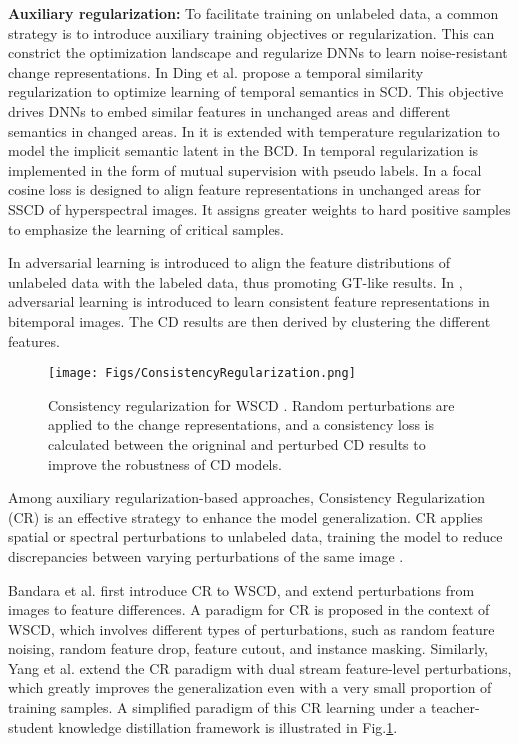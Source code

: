 \textbf{Auxiliary regularization:}
To facilitate training on unlabeled data, a common strategy is to introduce auxiliary training objectives or regularization. This can constrict the optimization landscape and regularize DNNs to learn noise-resistant change representations. In \cite{ding2022bi} Ding et al. propose a temporal similarity regularization to optimize learning of temporal semantics in SCD. This objective drives DNNs to embed similar features in unchanged areas and different semantics in changed areas. In \cite{ding2024samcd} it is extended with temperature regularization to model the implicit semantic latent in the BCD. In \cite{zheng2024detail} temporal regularization is implemented in the form of mutual supervision with pseudo labels.  In \cite{hu2022hypernet} a focal cosine loss is designed to align feature representations in unchanged areas for SSCD of hyperspectral images. It assigns greater weights to hard positive samples to emphasize the learning of critical samples. 

In \cite{peng2021semicdnet} adversarial learning is introduced to align the feature distributions of unlabeled data with the labeled data, thus promoting GT-like results. In \cite{dong2020self}, adversarial learning is introduced to learn consistent feature representations in bitemporal images. The CD results are then derived by clustering the different features.

\begin{figure}[t!]
	\begin{center}
        \texttt{[image: Figs/ConsistencyRegularization.png]}
	\end{center}
	\caption{Consistency regularization for WSCD \cite{bandara2022revisiting}. Random perturbations are applied to the change representations, and a consistency loss is calculated between the origninal and perturbed CD results to improve the robustness of CD models.}\label{fig.CR}
\end{figure}

Among auxiliary regularization-based approaches, Consistency Regularization (CR) is an effective strategy to enhance the model generalization. CR applies spatial or spectral perturbations to unlabeled data, training the model to reduce discrepancies between varying perturbations of the same image \cite{sohn2020fixmatch}.

Bandara et al. \cite{bandara2022revisiting} first introduce CR to WSCD, and extend perturbations from images to feature differences. A paradigm for CR is proposed in the context of WSCD, which involves different types of perturbations, such as random feature noising, random feature drop, feature cutout, and instance masking. Similarly, Yang et al. \cite{yang2023revisiting} extend the CR paradigm with dual stream feature-level perturbations, which greatly improves the generalization even with a very small proportion of training samples. A simplified paradigm of this CR learning under a teacher-student knowledge distillation framework is illustrated in Fig.\ref{fig.CR}.

